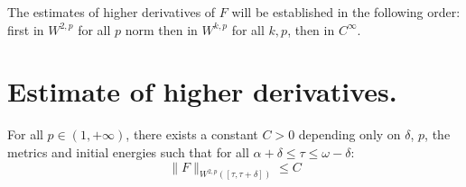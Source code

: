 The estimates of higher derivatives of \(F\) will be established in the following order: first in \(W^{2,p}\) for all \(p\) norm then in \(W^{k,p}\) for all \(k,p\), then in \(C^\infty\).

\section{Estimate of higher derivatives.}
\label{sec:org0f82044}

\begin{lemma}[\( W^{2,p} \)-boundedness]
\label{lem:bound-2-p}
For all \(p \in (1,+\infty)\), there exists a constant \(C>0\) depending only on \(\delta\), \(p\), the metrics and initial energies such that for all \(\alpha +\delta \leq \tau \leq \omega-\delta\):
\[
\|F\|_{W^{2,p}([\tau,\tau+\delta])}\leq C
\]
\end{lemma}

